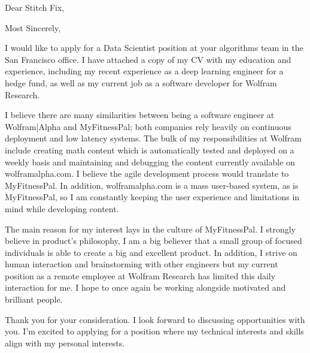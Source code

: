 \documentclass[11pt,a4paper,unicode]{moderncv}
\begin{document}
\vspace*{-6mm}

\vspace*{-6mm}



\date{\today} %


\opening{{Dear Stitch Fix},} %
\closing{Most Sincerely,} %

\makelettertitle %
	I would like to apply for a Data Scientist position at your algorithms team in the San Francisco office. I have attached a copy of my CV with my education and experience, including my recent experience as a deep learning engineer for a hedge fund, as well as my current job as a software developer for Wolfram Research. 
			
\vspace{3mm}  
	I believe there are many similarities between being a software engineer at Wolfram|Alpha and MyFitnessPal; both companies rely heavily on continuous deployment and low latency systems. The bulk of my responsibilities at Wolfram include creating math content which is automatically tested and deployed on a weekly basis and maintaining and debugging the content currently available on wolframalpha.com. I believe the agile development process would translate to MyFitnessPal. In addition, wolframalpha.com is a mass user-based system, as is MyFitnessPal, so I am constantly keeping the user experience and limitations in mind while developing content. 
	
\vspace{3mm}  
	The main reason for my interest lays in the culture of MyFitnessPal. I strongly believe in product's philosophy, I am a big believer that a small group of focused individuals is able to create a big and excellent product. In addition, I strive on human interaction and brainstorming with other engineers but my current position as a remote employee at Wolfram Research has limited this daily interaction for me. I hope to once again be working alongside motivated and brilliant people. 
	
\vspace{3mm}  
	Thank you for your consideration. I look forward to discussing opportunities with you. I'm excited to applying for a position where my technical interests and skills align with my personal interests. 

\makeletterclosing %
\end{document}
